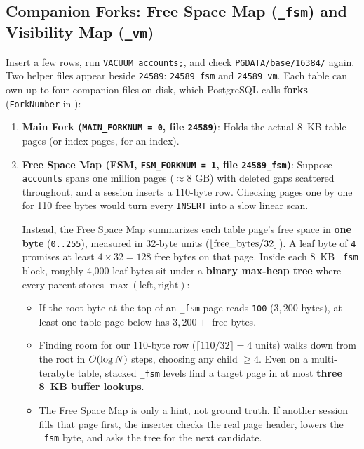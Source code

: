 \subsection{Companion Forks: Free Space Map (\texttt{\_fsm}) and Visibility Map (\texttt{\_vm})}

Insert a few rows, run \texttt{VACUUM accounts;}, and check \texttt{PGDATA/base/16384/} again. Two helper files appear beside \texttt{24589}: \texttt{24589\_fsm} and \texttt{24589\_vm}. Each table can own up to four companion files on disk, which PostgreSQL calls \textbf{forks} (\texttt{ForkNumber} in ):

\begin{enumerate}
  \item \textbf{Main Fork (\texttt{MAIN\_FORKNUM = 0}, file \texttt{24589})}: Holds the actual 8~KB table pages (or index pages, for an index).

  \item \textbf{Free Space Map (FSM, \texttt{FSM\_FORKNUM = 1}, file \texttt{24589\_fsm})}: Suppose \texttt{accounts} spans one million pages ($\approx 8\text{ GB}$) with deleted gaps scattered throughout, and a session inserts a 110-byte row. Checking pages one by one for 110 free bytes would turn every \texttt{INSERT} into a slow linear scan.

  Instead, the Free Space Map summarizes each table page's free space in \textbf{one byte} (\texttt{0..255}), measured in 32-byte units ($\lfloor\text{free\_bytes} / 32\rfloor$). A leaf byte of \texttt{4} promises at least $4 \times 32 = 128$ free bytes on that page. Inside each 8~KB \texttt{\_fsm} block, roughly 4,000 leaf bytes sit under a \textbf{binary max-heap tree} where every parent stores $\max(\text{left}, \text{right})$:
  \begin{itemize}
    \item If the root byte at the top of an \texttt{\_fsm} page reads \texttt{100} ($3{,}200$ bytes), at least one table page below has $3{,}200+$ free bytes.
    \item Finding room for our 110-byte row ($\lceil 110 / 32 \rceil = 4$ units) walks down from the root in $O(\log N)$ steps, choosing any child $\ge 4$. Even on a multi-terabyte table, stacked \texttt{\_fsm} levels find a target page in at most \textbf{three 8~KB buffer lookups}.
    \item The Free Space Map is only a hint, not ground truth. If another session fills that page first, the inserter checks the real page header, lowers the \texttt{\_fsm} byte, and asks the tree for the next candidate.
  \end{itemize}


\end{enumerate}
